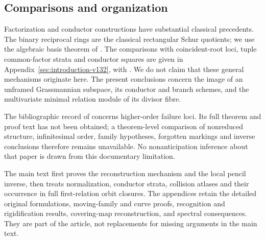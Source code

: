 \subsection{Comparisons and organization}
Factorization and conductor constructions have substantial classical
precedents. The binary reciprocal rings are the classical rectangular
Schur quotients; we use the algebraic basis theorem of
\cite[Theorem~2.7]{Grinberg2019}. The comparisons with coincident-root
loci, tuple common-factor strata and conductor squares are given in
Appendix~\ref{sec:introduction-v132}, with
\cite{Chipalkatti2003,Kurmann2012,HuLinShao2007,Ferrand2003}.
We do not claim that these general mechanisms originate here. The
present conclusions concern the image of an unframed Grassmannian
subspace, its conductor and branch schemes, and the multivariate
minimal relation module of its divisor fibre.

The bibliographic record of \cite{Ballico93} concerns higher-order
failure loci. Its full theorem and proof text has not been obtained;
a theorem-level comparison of nonreduced structure, infinitesimal
order, family hypotheses, forgotten markings and inverse conclusions
therefore remains unavailable. No nonanticipation inference about that
paper is drawn from this documentary limitation.

The main text first proves the reconstruction mechanism and the local
pencil inverse, then treats normalization, conductor strata, collision
atlases and their occurrence in full first-relation orbit closures.
The appendices retain the detailed original formulations, moving-family
and curve proofs, recognition and rigidification results, covering-map
reconstruction, and spectral consequences. They are part of the article,
not replacements for missing arguments in the main text.
